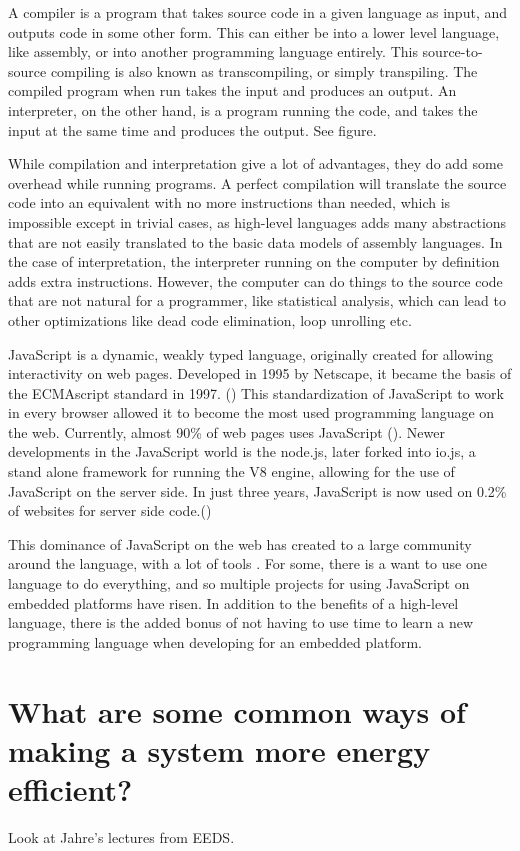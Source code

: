 A compiler is a program that takes source code in a given language as input, and outputs code in some other form. 
This can either be into a lower level language, like assembly, or into another programming language entirely.
This source-to-source compiling is also known as transcompiling, or simply transpiling.
The compiled program when run takes the input and produces an output. 
An interpreter, on the other hand, is a program running the code, and takes the input at the same time and produces the output. See figure.

While compilation and interpretation give a lot of advantages, they do add some overhead while running programs. 
A perfect compilation will translate the source code into an equivalent with no more instructions than needed, which is impossible except in trivial cases, as high-level languages adds many abstractions that are not easily translated to the basic data models of assembly languages. 
In the case of interpretation, the interpreter running on the computer by definition adds extra instructions. 
However, the computer can do things to the source code that are not natural for a programmer, like statistical analysis, which can lead to other optimizations like dead code elimination, loop unrolling etc.

JavaScript is a dynamic, weakly typed language, originally created for allowing interactivity on web pages.
Developed in 1995 by Netscape, it became the basis of the ECMAscript standard in 1997. (\cite{jshistory})
This standardization of JavaScript to work in every browser allowed it to become the most used programming language on the web.
Currently, almost 90\% of web pages uses JavaScript (\cite{jsclientstats}).
Newer developments in the JavaScript world is the node.js, later forked into io.js, a stand alone framework for running the V8 engine, allowing for the use of JavaScript on the server side.
In just three years, JavaScript is now used on 0.2\% of websites for server side code.(\cite{jsserverstats})

This dominance of JavaScript on the web has created to a large community around the language, with a lot of tools .
For some, there is a want to use one language to do everything, and so multiple projects for using JavaScript on embedded platforms have risen.
In addition to the benefits of a high-level language, there is the added bonus of not having to use time to learn a new programming language when developing for an embedded platform.

\section{What are some common ways of making a system more energy efficient?}
Look at Jahre's lectures from EEDS.

